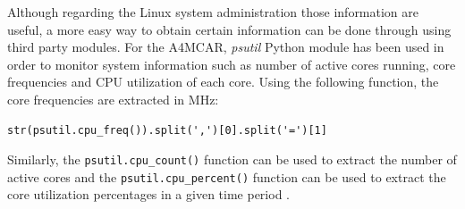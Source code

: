 Although regarding the Linux system administration those information are useful, a more easy way to obtain certain information can be done through using third party modules. For the A4MCAR, \textit{psutil} Python module has been used in order to monitor system information such as number of active cores running, core frequencies and CPU utilization of each core. 
Using the following function, the core frequencies are extracted in MHz:
\begin{lstlisting}[style=python]
	str(psutil.cpu_freq()).split(',')[0].split('=')[1]
\end{lstlisting}
Similarly, the \texttt{psutil.cpu\texttt{\_}count()} function can be used to extract the number of active cores and the \texttt{psutil.cpu\texttt{\_}percent()} function can be used to extract the core utilization percentages in a given time period \cite{psutil}. 


